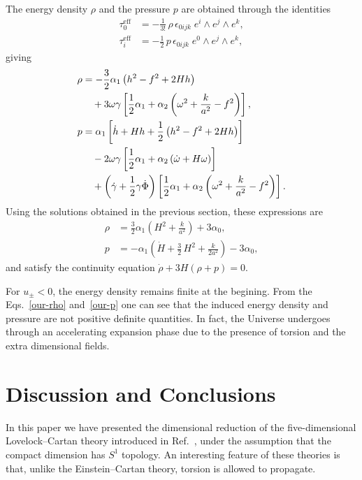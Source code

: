 \documentclass[aps,prd,12pt,superscriptaddress,showpacs,showkeys,longbibliography,reprint,nofootinbib]{revtex4-1}
\begin{document}
The energy density $\rho$ and the pressure $p$ are obtained through the identities
\begin{align}
  \tau_0^{\mathrm{eff}} &= -\frac{1}{3!} \, \rho \, \epsilon_{0ijk} \; e^i\wedge e^j\wedge e^k,\\
  \tau_i^{\mathrm{eff}} &= -\frac{1}{2} \,p \, \epsilon_{0ijk} \; e^0\wedge e^j\wedge e^k,
\end{align} 
giving
\begin{align}
  \label{rho}
  \rho &= -\frac{3}{2}\alpha_1\left(h^2-f^2+2Hh\right) \\
  & \quad + 3\omega\gamma\left[\frac{1}{2}\alpha_1+\alpha_2\left(\omega^2+\frac{k}{a^2}-f^2\right)\right], \notag
  \\
  \label{presion}
  p &= \alpha_1\left[\dot{h}+Hh+\frac{1}{2}\left(h^2-f^2+2Hh\right)\right]\\
  & \quad - 2\omega\gamma\left[\frac{1}{2}\alpha_1+\alpha_2\left(\dot{\omega}+H\omega\right)\right]\notag\\
  & \quad +\left(\dot{\gamma}+\frac{1}{2}\gamma\dot{\Phi}\right)\left[\frac{1}{2}\alpha_1+\alpha_2\left(\omega^2+\frac{k}{a^2}-f^2\right)\right]. \notag
\end{align}
Using the solutions obtained in the previous section, these expressions are
\begin{align}
  \label{our-rho}
  \rho &= \frac{3}{2}\alpha_1\left(H^2 + \frac{k}{a^2}\right) + 3\alpha_0, \\
  \label{our-p}
  p &= -\alpha_1\left(\dot{H} + \frac{3}{2}\,H^2 + \frac{k}{2a^2}\right) - 3\alpha_0,
\end{align}
and satisfy the continuity equation $\dot{\rho}+3H\left(\rho+p\right)=0$. 

For $u_\pm<0$, the energy density remains finite at the begining. From the Eqs.~\eqref{our-rho} and~\eqref{our-p} one can see that the induced energy density and pressure are not positive definite quantities. In fact, the Universe undergoes through an accelerating expansion phase due to the presence of torsion and the extra dimensional fields. 


\section{Discussion and Conclusions\label{conclusions}}

In this paper we have presented the dimensional reduction of the five-dimensional Lovelock--Cartan theory introduced in Ref.~\cite{Mardones:1990qc}, under the assumption that the compact dimension has $S^1$ topology. An interesting feature of these theories is that, unlike the Einstein--Cartan theory, torsion is allowed to propagate.
\end{document}
